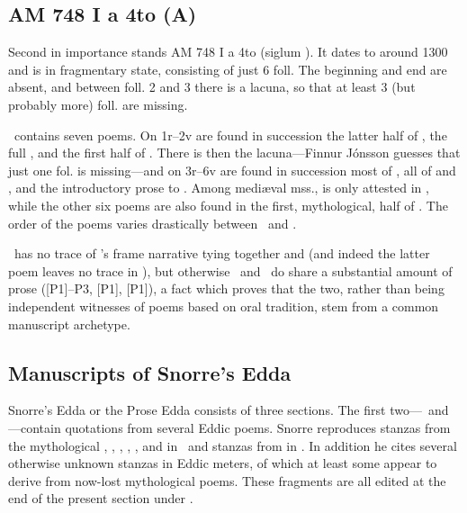\subsection{AM 748 I a 4to (A)}

Second in importance stands AM 748 I a 4to (siglum \AM).  It dates to around 1300 and is in fragmentary state, consisting of just 6 foll.  The beginning and end are absent, and between foll. 2 and 3 there is a lacuna, so that at least 3 (but probably more) foll. are missing.

\AM\ contains seven poems.  On 1r--2v are found in succession the latter half of , the full , and the first half of .  There is then the lacuna---Finnur Jónsson guesses that just one fol. is missing---and on 3r--6v are found in succession most of , all of  and , and the introductory prose to .  Among mediæval mss.,  is only attested in \AM, while the other six poems are also found in the first, mythological, half of \Regius. The order of the poems varies drastically between \AM\ and \Regius.

\AM\ has no trace of \Regius’s frame narrative tying together  and  (and indeed the latter poem leaves no trace in \AM), but otherwise \AM\ and \Regius\ do share a substantial amount of prose ([P1]--P3, [P1], [P1]), a fact which proves that the two, rather than being independent witnesses of poems based on oral tradition, stem from a common manuscript archetype.

\subsection{Manuscripts of Snorre’s Edda}

Snorre’s Edda or the Prose Edda consists of three sections.  The first two---\Gylfaginning\ and \Skaldskaparmal---contain quotations from several Eddic poems.  Snorre reproduces stanzas from the mythological , , , , , and  in \Gylfaginning\ and stanzas from  in \Skaldskaparmal.  In addition he cites several otherwise unknown stanzas in Eddic meters, of which at least some appear to derive from now-lost mythological poems.  These fragments are all edited at the end of the present section under .

